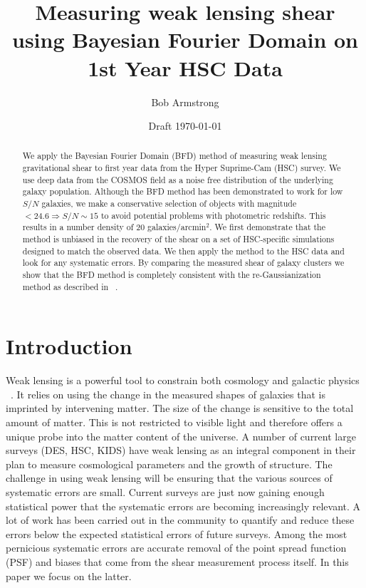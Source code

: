 \documentclass[useAMS,usenatbib]{mnras}
\title{Measuring weak lensing shear using Bayesian Fourier Domain on 1st Year HSC Data}
\author{Bob Armstrong}
\begin{document}
\date{Draft \today}
\maketitle

\begin{abstract}
We apply the Bayesian Fourier Domain (BFD) method of measuring weak lensing gravitational shear to first year data from the Hyper Suprime-Cam (HSC) survey.  We use deep data from the COSMOS field as a noise free distribution of the underlying galaxy population.  Although the BFD method has been demonstrated to work for low $S/N$ galaxies, we make a conservative selection of objects with magnitude $< 24.6 \Rightarrow S/N \sim 15 $ to avoid potential problems with photometric redshifts.  This results in a number density of 20 galaxies/arcmin$^2$.  We first demonstrate that the method is unbiased in the recovery of the shear on a set of HSC-specific simulations designed to match the observed data.  We then apply the method to the HSC data and look for any systematic errors.  By comparing the measured shear of galaxy clusters we show that the BFD method is completely consistent with the re-Gaussianization method as described in ~\cite{ShearPaper:inprep}.
\end{abstract}


\section{Introduction}

Weak lensing is a powerful tool to constrain both cosmology\citep{2010A&A...516A..63S, 2013MNRAS.432.2433H, DES_CS_cosmology,2017MNRAS.465.1454H} and galactic physics ~\citep{2010ApJ...709...97L, 2012MNRAS.425.2610R, 2017MNRAS.467.3024L}.  It relies on using the change in the measured shapes of galaxies that is imprinted by intervening matter.  The size of the change is sensitive to the total amount of matter.  This is not restricted to visible light and therefore offers a unique probe into the matter content of the universe.  A number of current large surveys (DES, HSC, KIDS) have weak lensing as an integral component in their plan to measure cosmological parameters and the growth of structure.  The challenge in using weak lensing will be ensuring that the various sources of systematic errors are small.  Current surveys are just now gaining enough statistical power that the systematic errors are becoming increasingly relevant.   A lot of work has been carried out in the community to quantify \citep{2006MNRAS.368.1323H,2010MNRAS.405.2044B, 2012MNRAS.423.3163K,  2015MNRAS.450.2963M} and reduce these errors below the expected statistical errors of future surveys.  Among the most pernicious systematic errors are accurate removal of the point spread function (PSF) and biases that come from the shear measurement process itself.  In this paper we focus on the latter.
\end{document}
